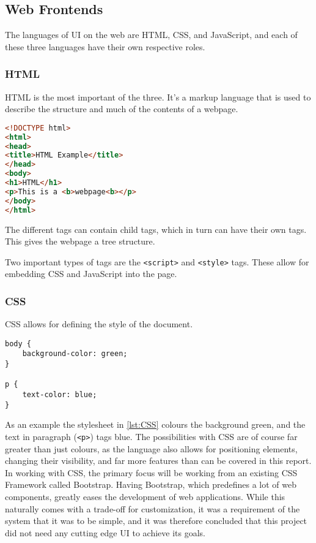 \documentclass[../../master.tex]{subfiles}
\begin{document}
\subsection{Web Frontends} \label{sec:webfrontends}
The languages of UI on the web are HTML, CSS, and JavaScript, and each of these three languages have their own respective roles.\cite{nixonweb}
\subsubsection*{HTML}
HTML is the most important of the three.
It's a markup language that is used to describe the structure and much of the contents of a webpage.
\begin{lstlisting}[language=HTML,caption={An example HTML page},label=lst:HTML]
<!DOCTYPE html>
<html>
<head>
<title>HTML Example</title>
</head>
<body>
<h1>HTML</h1>
<p>This is a <b>webpage<b></p>
</body>
</html>
\end{lstlisting}
The different tags can contain child tags, which in turn can have their own tags.
This gives the webpage a tree structure.

Two important types of tags are the \texttt{<script>} and \texttt{<style>} tags.
These allow for embedding CSS and JavaScript into the page.

\subsubsection*{CSS}
CSS allows for defining the style of the document.
\begin{lstlisting}[caption={A simple CSS style with blue text on a green background},label=lst:CSS]
body {
	background-color: green;
}

p {
	text-color: blue;
}
\end{lstlisting}
As an example the stylesheet in \cref{lst:CSS} colours the background green, and the text in paragraph (\texttt{<p>}) tags blue.
The possibilities with CSS are of course far greater than just colours, as the language also allows for positioning elements, changing their visibility, and far more features than can be covered in this report.\cite{nixonweb}
In working with CSS, the primary focus will be working from an existing CSS Framework called Bootstrap.
Having Bootstrap, which predefines a lot of web components, greatly eases the development of web applications.
While this naturally comes with a trade-off for customization, it was a requirement of the system that it was to be simple, and it was therefore concluded that this project did not need any cutting edge UI to achieve its goals.
\end{document}
